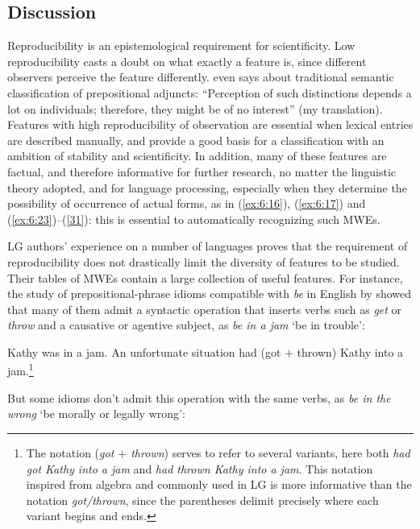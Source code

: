 \documentclass[output=paper]{langsci/langscibook}
\begin{document}
\subsection{Discussion}  

Reproducibility is an epistemological requirement for scientificity. Low reproducibility casts a doubt on what exactly a feature is, since different observers perceive the feature differently. \citet[14]{Gross1981} even says about traditional semantic classification of prepositional adjuncts: “Perception of such distinctions depends a lot on individuals; therefore, they might be of no interest” (my translation). Features with high reproducibility of observation are essential when lexical entries are described manually, and provide a good basis for a classification with an ambition of stability and scientificity. In addition, many of these features are factual, and therefore informative for further research, no matter the linguistic theory adopted, and for language processing, especially when they determine the possibility of occurrence of actual forms, as in (\ref{ex:6:16}), (\ref{ex:6:17}) and (\ref{ex:6:23})–(\ref{31}): this is essential to automatically recognizing such MWEs.

LG authors’ experience on a number of languages proves that the requirement of reproducibility does not drastically limit the diversity of features to be studied. Their tables of MWEs contain a large collection of useful features. For instance, the study of prepositional-phrase idioms compatible with \textit{be} in English by \citet{Machonis1987} showed that many of them admit a syntactic operation that inserts verbs such as \textit{get} or \textit{throw} and a causative or agentive subject, as \textit{be in a jam} ‘be in trouble’:


\begin{exe}
\ex \label{37} 
\begin{xlist}
\ex \label{37a}
Kathy was in a jam.
\ex \label{37b}
An unfortunate situation had (got $+$ thrown) Kathy into a jam.\footnote{ The notation (\textit{got $+$ thrown}) serves to refer to several variants, here both \textit{had got Kathy into a jam} and\textit{ had thrown Kathy into a jam}. This notation inspired from algebra and commonly used in LG is more informative than the notation \textit{got/thrown}, since the parentheses delimit precisely where each variant begins and ends.}
\end{xlist}
\end{exe}

\noindent But some idioms don’t admit this operation with the same verbs, as \textit{be in the wrong} ‘be morally or legally wrong’:
\end{document}
